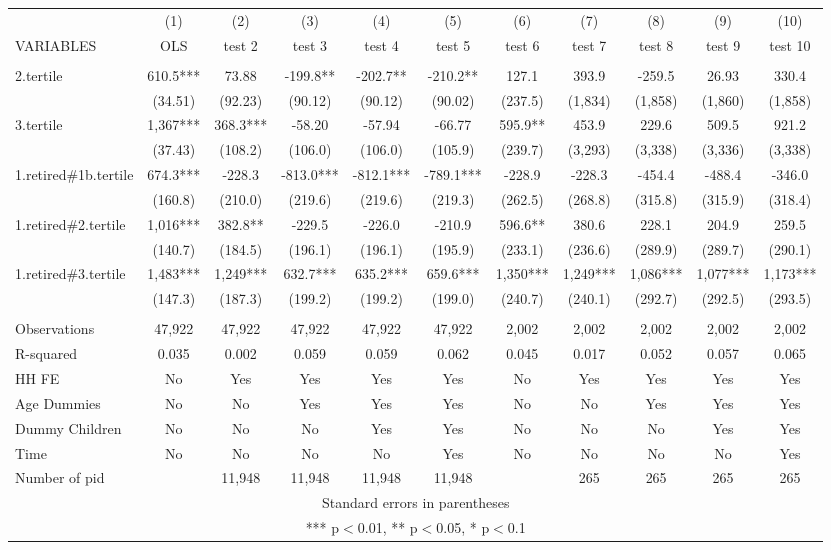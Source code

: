 \begin{tabular}{lcccccccccc} \hline
 & (1) & (2) & (3) & (4) & (5) & (6) & (7) & (8) & (9) & (10) \\
VARIABLES & OLS & test 2 & test 3 & test 4 & test 5 & test 6 & test 7 & test 8 & test 9 & test 10 \\ \hline
 &  &  &  &  &  &  &  &  &  &  \\
2.tertile & 610.5*** & 73.88 & -199.8** & -202.7** & -210.2** & 127.1 & 393.9 & -259.5 & 26.93 & 330.4 \\
 & (34.51) & (92.23) & (90.12) & (90.12) & (90.02) & (237.5) & (1,834) & (1,858) & (1,860) & (1,858) \\
3.tertile & 1,367*** & 368.3*** & -58.20 & -57.94 & -66.77 & 595.9** & 453.9 & 229.6 & 509.5 & 921.2 \\
 & (37.43) & (108.2) & (106.0) & (106.0) & (105.9) & (239.7) & (3,293) & (3,338) & (3,336) & (3,338) \\
1.retired\#1b.tertile & 674.3*** & -228.3 & -813.0*** & -812.1*** & -789.1*** & -228.9 & -228.3 & -454.4 & -488.4 & -346.0 \\
 & (160.8) & (210.0) & (219.6) & (219.6) & (219.3) & (262.5) & (268.8) & (315.8) & (315.9) & (318.4) \\
1.retired\#2.tertile & 1,016*** & 382.8** & -229.5 & -226.0 & -210.9 & 596.6** & 380.6 & 228.1 & 204.9 & 259.5 \\
 & (140.7) & (184.5) & (196.1) & (196.1) & (195.9) & (233.1) & (236.6) & (289.9) & (289.7) & (290.1) \\
1.retired\#3.tertile & 1,483*** & 1,249*** & 632.7*** & 635.2*** & 659.6*** & 1,350*** & 1,249*** & 1,086*** & 1,077*** & 1,173*** \\
 & (147.3) & (187.3) & (199.2) & (199.2) & (199.0) & (240.7) & (240.1) & (292.7) & (292.5) & (293.5) \\
 &  &  &  &  &  &  &  &  &  &  \\
Observations & 47,922 & 47,922 & 47,922 & 47,922 & 47,922 & 2,002 & 2,002 & 2,002 & 2,002 & 2,002 \\
R-squared & 0.035 & 0.002 & 0.059 & 0.059 & 0.062 & 0.045 & 0.017 & 0.052 & 0.057 & 0.065 \\
HH FE & No & Yes & Yes & Yes & Yes & No & Yes & Yes & Yes & Yes \\
Age Dummies & No & No & Yes & Yes & Yes & No & No & Yes & Yes & Yes \\
Dummy Children & No & No & No & Yes & Yes & No & No & No & Yes & Yes \\
Time & No & No & No & No & Yes & No & No & No & No & Yes \\
 Number of pid &  & 11,948 & 11,948 & 11,948 & 11,948 &  & 265 & 265 & 265 & 265 \\ \hline
\multicolumn{11}{c}{ Standard errors in parentheses} \\
\multicolumn{11}{c}{ *** p$<$0.01, ** p$<$0.05, * p$<$0.1} \\
\end{tabular}
